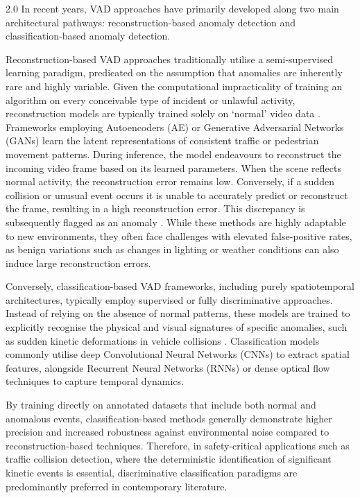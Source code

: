 \begin{spacing}{2.0}
In recent years, VAD approaches have primarily developed along two main architectural pathways: reconstruction-based anomaly detection and classification-based anomaly detection.

Reconstruction-based VAD approaches traditionally utilise a semi-supervised learning paradigm, predicated on the assumption that anomalies are inherently rare and highly variable. Given the computational impracticality of training an algorithm on every conceivable type of incident or unlawful activity, reconstruction models are typically trained solely on ‘normal’ video data \cite{gong_memorizing_2019}. Frameworks employing Autoencoders (AE) or Generative Adversarial Networks (GANs) learn the latent representations of consistent traffic or pedestrian movement patterns. During inference, the model endeavours to reconstruct the incoming video frame based on its learned parameters. When the scene reflects normal activity, the reconstruction error remains low. Conversely, if a sudden collision or unusual event occurs it is unable to accurately predict or reconstruct the frame, resulting in a high reconstruction error. This discrepancy is subsequently flagged as an anomaly \cite{liu_future_2018}. While these methods are highly adaptable to new environments, they often face challenges with elevated false-positive rates, as benign variations such as changes in lighting or weather conditions can also induce large reconstruction errors.

Conversely, classification-based VAD frameworks, including purely spatiotemporal architectures, typically employ supervised or fully discriminative approaches. Instead of relying on the absence of normal patterns, these models are trained to explicitly recognise the physical and visual signatures of specific anomalies, such as sudden kinetic deformations in vehicle collisions \cite{sultani_real-world_2018}. Classification models commonly utilise deep Convolutional Neural Networks (CNNs) to extract spatial features, alongside Recurrent Neural Networks (RNNs) or dense optical flow techniques to capture temporal dynamics.

By training directly on annotated datasets that include both normal and anomalous events, classification-based methods generally demonstrate higher precision and increased robustness against environmental noise compared to reconstruction-based techniques. Therefore, in safety-critical applications such as traffic collision detection, where the deterministic identification of significant kinetic events is essential, discriminative classification paradigms are predominantly preferred in contemporary literature.


\end{spacing}
